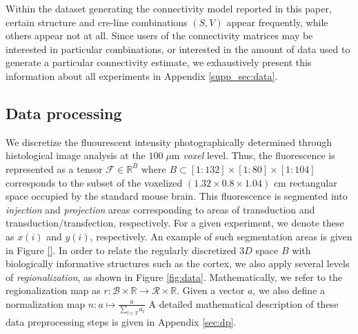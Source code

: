 \documentclass[NETN,manuscript]{stjour-new}
\begin{document}
Within the dataset generating the connectivity model reported in this paper, certain structure and cre-line combinations $(S,V)$ appear frequently, while others appear not at all.
Since users of the connectivity matrices may be interested in particular combinations, or interested in the amount of data used to generate a particular connectivity estimate, we exhaustively present this information about all experiments in Appendix \ref*{supp_sec:data}.

\subsection{Data processing}
\label{sec:data_pre}

We discretize the fluourescent intensity photographically determined through histological image analysis  at the $100 \; \mu$m \textit{voxel} level.
Thus, the fluorescence is represented as a tensor $\mathcal F \in  \mathbb R^B$ where $B \subset [1:132] \times [1:80] \times [1:104]$ corresponds to the subset of the voxelized $(1.32 \times 0.8 \times 1.04)$ cm rectangular space occupied by the standard mouse brain.
This fluorescence is segmented into \textit{injection} and \textit{projection} areas corresponding to areas of transduction and transduction/transfection, respectively.
For a given experiment, we denote these as $x(i)$ and $y(i)$, respectively.
An example of such segmentation areas is given in Figure \ref{}.
In order to relate the regularly discretized $3D$ space $B$ with biologically informative structures such as the cortex, we also apply several levels of  \textit{regionalization}, as shown in Figure \ref{fig:data}.
Mathematically, we refer to the regionalization map as $r: \mathcal B \times \mathbb R \to \mathcal R \times \mathbb R$.
Given a vector $a$, we also define a normalization map $n: a \mapsto \frac{a}{\sum_{t \in T} a_t}$
A detailed mathematical description of these data preprocessing steps is given in Appendix \ref{sec:dp}.






%
\end{document}
